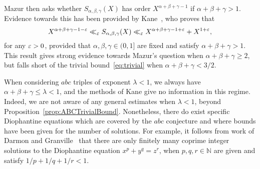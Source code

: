 Mazur then asks whether
 $S_{\alpha,\beta,\gamma}(X)$ has order $X^{\alpha+\beta+\gamma-1}$
if $\alpha+\beta+\gamma>1$.
Evidence towards this has been provided by Kane~\cite[Theorems~1 and 2]{kane}, who proves that
\[
X^{\alpha+\beta+\gamma-1-\varepsilon}\ll_\varepsilon
S_{\alpha,\beta,\gamma}(X)\ll_\varepsilon
X^{\alpha+\beta+\gamma-1+\varepsilon}+X^{1+\varepsilon},
\]
for any $\varepsilon>0$,
provided that $\alpha,\beta,\gamma\in (0,1]$ are fixed and satisfy $\alpha+\beta+\gamma>1$.
This result gives strong evidence towards Mazur's question when
$\alpha+\beta+\gamma\geq 2$, but falls short of the trivial bound~\eqref{eq:trivial}
when $\alpha+\beta+\gamma<3/2$.


When considering $abc$ triples of exponent $\lambda<1$, we always have $\alpha+\beta+\gamma\leq \lambda< 1$, and the methods of Kane give no information
in this regime. Indeed, we are not aware of any general estimates when $\lambda<1$,
 beyond Proposition~\ref{prop:ABCTrivialBound}. Nonetheless, there do exist specific Diophantine equations which are covered by the $abc$ conjecture and where bounds have been given for the number of solutions.
For example, it follows from work of Darmon and
Granville~\cite{DG} that there are only finitely many coprime integer solutions to the Diophantine equation $x^p+y^q=z^r$, when $p,q,r\in \mathbb{N}$ are given and satisfy $1/p+1/q+1/r<1$.


